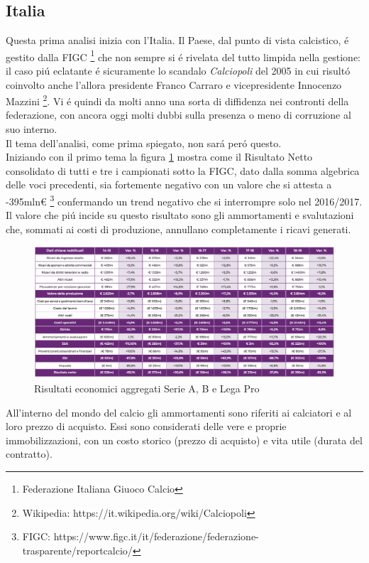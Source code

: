 \documentclass[
    corpo=12pt,
    oneside,
    evenboxes,
    tipotesi=triennale,
    stile=classica,
    oldstyle,
    autoretitolo,
    greek,
]{toptesi}
\begin{document}
\begin{interlinea}{1.5}
\subsection{Italia}
Questa prima analisi inizia con l'Italia. Il Paese, dal punto di vista calcistico, \'e gestito dalla FIGC \footnote{Federazione Italiana Giuoco Calcio}
che non sempre si \'e rivelata del tutto limpida nella gestione: il caso pi\'u eclatante \'e sicuramente lo scandalo \emph{Calciopoli} del
2005 in cui risult\'o coinvolto anche l'allora presidente Franco Carraro e vicepresidente Innocenzo Mazzini \footnote{Wikipedia: https://it.wikipedia.org/wiki/Calciopoli}.
Vi \'e quindi da molti anno una sorta di diffidenza nei contronti della federazione, con ancora oggi molti dubbi sulla presenza o meno di 
corruzione al suo interno.\\
Il tema dell'analisi, come prima spiegato, non sar\'a per\'o questo.\\
Iniziando con il primo tema la figura \ref{ris_italia} mostra come il Risultato Netto consolidato di tutti e tre i campionati 
sotto la FIGC, dato dalla somma algebrica delle voci precedenti, sia fortemente negativo con un valore che si attesta 
a -395mln€ \footnote{FIGC: https://www.figc.it/it/federazione/federazione-trasparente/reportcalcio/} confermando un trend negativo che
si interrompre solo nel 2016/2017.
Il valore che pi\'u incide su questo risultato sono gli ammortamenti e svalutazioni che, sommati ai costi di produzione, 
annullano completamente i ricavi generati. 
\begin{figure}
    \centering
    \includegraphics[scale=0.4]{img/ris_italia.png}
    \caption{Risultati economici aggregati Serie A, B e Lega Pro}
    \label{ris_italia}
\end{figure}
All'interno del mondo del calcio gli ammortamenti sono riferiti ai calciatori e al loro prezzo di acquisto. Essi sono considerati delle 
vere e proprie immobilizzazioni, con un costo storico (prezzo di acquisto) e vita utile (durata del contratto). 

\end{interlinea}
\end{document}
